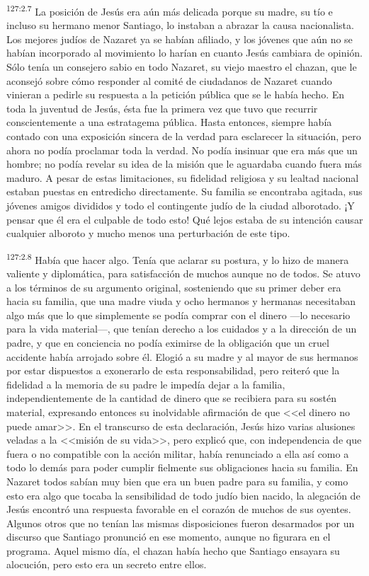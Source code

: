 \par 
\textsuperscript{127:2.7} La posición de Jesús era aún más delicada porque su madre, su tío e incluso su hermano menor Santiago, lo instaban a abrazar la causa nacionalista. Los mejores judíos de Nazaret ya se habían afiliado, y los jóvenes que aún no se habían incorporado al movimiento lo harían en cuanto Jesús cambiara de opinión. Sólo tenía un consejero sabio en todo Nazaret, su viejo maestro el chazan, que le aconsejó sobre cómo responder al comité de ciudadanos de Nazaret cuando vinieran a pedirle su respuesta a la petición pública que se le había hecho. En toda la juventud de Jesús, ésta fue la primera vez que tuvo que recurrir conscientemente a una estratagema pública. Hasta entonces, siempre había contado con una exposición sincera de la verdad para esclarecer la situación, pero ahora no podía proclamar toda la verdad. No podía insinuar que era más que un hombre; no podía revelar su idea de la misión que le aguardaba cuando fuera más maduro. A pesar de estas limitaciones, su fidelidad religiosa y su lealtad nacional estaban puestas en entredicho directamente. Su familia se encontraba agitada, sus jóvenes amigos divididos y todo el contingente judío de la ciudad alborotado. ¡Y pensar que él era el culpable de todo esto! Qué lejos estaba de su intención causar cualquier alboroto y mucho menos una perturbación de este tipo.

\par 
\textsuperscript{127:2.8} Había que hacer algo. Tenía que aclarar su postura, y lo hizo de manera valiente y diplomática, para satisfacción de muchos aunque no de todos. Se atuvo a los términos de su argumento original, sosteniendo que su primer deber era hacia su familia, que una madre viuda y ocho hermanos y hermanas necesitaban algo más que lo que simplemente se podía comprar con el dinero ---lo necesario para la vida material---, que tenían derecho a los cuidados y a la dirección de un padre, y que en conciencia no podía eximirse de la obligación que un cruel accidente había arrojado sobre él. Elogió a su madre y al mayor de sus hermanos por estar dispuestos a exonerarlo de esta responsabilidad, pero reiteró que la fidelidad a la memoria de su padre le impedía dejar a la familia, independientemente de la cantidad de dinero que se recibiera para su sostén material, expresando entonces su inolvidable afirmación de que <<el dinero no puede amar>>. En el transcurso de esta declaración, Jesús hizo varias alusiones veladas a la <<misión de su vida>>, pero explicó que, con independencia de que fuera o no compatible con la acción militar, había renunciado a ella así como a todo lo demás para poder cumplir fielmente sus obligaciones hacia su familia. En Nazaret todos sabían muy bien que era un buen padre para su familia, y como esto era algo que tocaba la sensibilidad de todo judío bien nacido, la alegación de Jesús encontró una respuesta favorable en el corazón de muchos de sus oyentes. Algunos otros que no tenían las mismas disposiciones fueron desarmados por un discurso que Santiago pronunció en ese momento, aunque no figurara en el programa. Aquel mismo día, el chazan había hecho que Santiago ensayara su alocución, pero esto era un secreto entre ellos.

